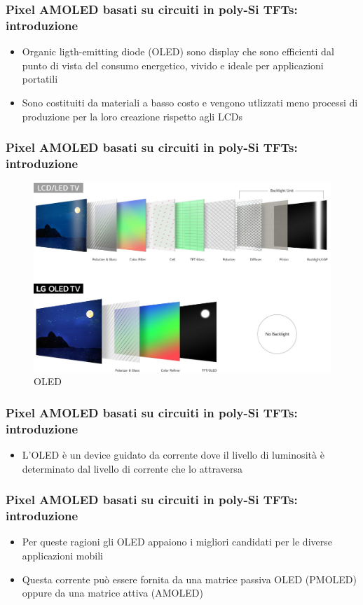 \documentclass[12pt]{beamer}
\begin{document}
	\begin{frame}
		\frametitle{Pixel AMOLED basati su circuiti in poly-Si TFTs: introduzione}
		\begin{itemize}
			\item Organic ligth-emitting diode (OLED) sono display che sono efficienti dal punto di vista del consumo energetico, vivido e ideale per applicazioni portatili 
			\pause
			\item Sono costituiti da materiali a basso costo e vengono utlizzati meno processi di produzione per la loro creazione rispetto agli LCDs
		\end{itemize}
	\end{frame}
	\begin{frame}
		\frametitle{Pixel AMOLED basati su circuiti in poly-Si TFTs: introduzione}
		\begin{figure}
			\centering
			\includegraphics[width=1\linewidth]{IMMAGINI/oled}
			\caption{OLED}
			\label{fig:oled}
		\end{figure}
	\end{frame}
	\begin{frame}
		\frametitle{Pixel AMOLED basati su circuiti in poly-Si TFTs: introduzione}
		\begin{itemize}
			\item L’OLED è un device guidato da corrente dove il livello di luminosità è determinato dal livello di corrente che lo attraversa
		\end{itemize}
	\end{frame}
	\begin{frame}
		\frametitle{Pixel AMOLED basati su circuiti in poly-Si TFTs: introduzione}
		\begin{itemize}
			\item Per queste ragioni gli OLED appaiono i migliori candidati per le diverse applicazioni mobili
			\pause
			\item Questa corrente può essere fornita da una matrice passiva OLED (PMOLED) oppure da una matrice attiva (AMOLED)
		\end{itemize}
	\end{frame}
\end{document}
